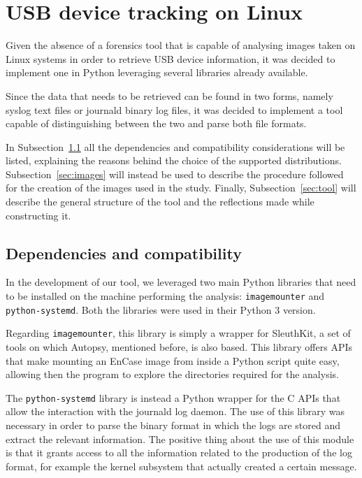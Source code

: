 \documentclass[a4paper]{article}
\begin{document}
\section{USB device tracking on Linux}
\label{sec:contrib}
Given the absence of a forensics tool that is capable of analysing images taken
on Linux systems in order to retrieve USB device information, it was decided to
implement one in Python leveraging several libraries already available.

Since the data that needs to be retrieved can be found in two forms, namely
syslog text files or journald binary log files, it was decided to implement a
tool capable of distinguishing between the two and parse both file formats.

In Subsection~\ref{sec:prems} all the dependencies and compatibility
considerations will be listed, explaining the reasons behind the choice of the
supported distributions. Subsection~\ref{sec:images} will instead be used to
describe the procedure followed for the creation of the images used in the
study. Finally, Subsection~\ref{sec:tool} will describe the general structure of
the tool and the reflections made while constructing it.

\subsection{Dependencies and compatibility}
\label{sec:prems}
In the development of our tool, we leveraged two main Python libraries that need
to be installed on the machine performing the analysis:
\texttt{imagemounter} and \texttt{python-systemd}. Both the libraries were used
in their Python 3 version.

Regarding \texttt{imagemounter}, this library is simply a wrapper for
SleuthKit, a set of tools on which Autopsy, mentioned before, is also based.
This library offers APIs that make mounting an EnCase image from inside a Python
script quite easy, allowing then the program to explore the directories required
for the analysis.

The \texttt{python-systemd} library is instead a Python wrapper for the C APIs
that allow the interaction with the journald log daemon. The use of this library
was necessary in order to parse the binary format in which the logs are stored
and extract the relevant information. The positive thing about the use of this
module is that it grants access to all the information related to the production
of the log format, for example the kernel subsystem that actually created a
certain message.
\end{document}
